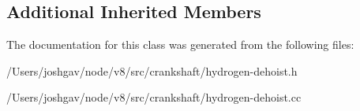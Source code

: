 \subsection*{Additional Inherited Members}


The documentation for this class was generated from the following files\+:\begin{DoxyCompactItemize}
\item 
/\+Users/joshgav/node/v8/src/crankshaft/hydrogen-\/dehoist.\+h\item 
/\+Users/joshgav/node/v8/src/crankshaft/hydrogen-\/dehoist.\+cc\end{DoxyCompactItemize}
